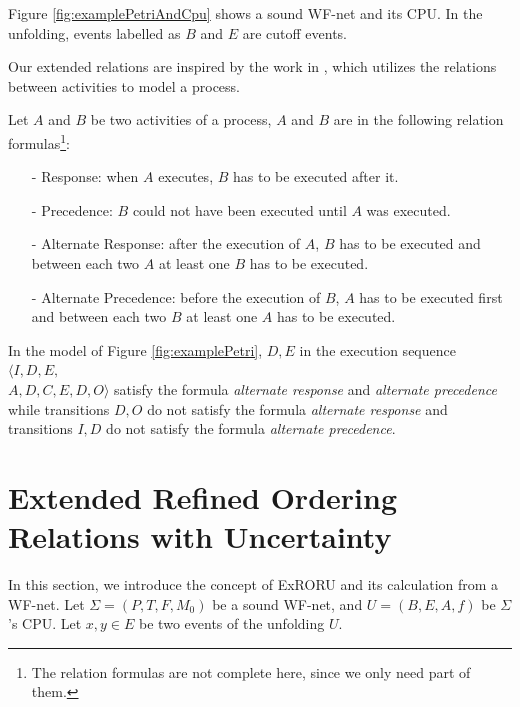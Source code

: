 \documentclass[dvips,...]{llncs}
\begin{document}
\begin{example}\label{ex:petriAndCpu}
Figure \ref{fig:examplePetriAndCpu} shows a sound WF-net and its CPU. In the unfolding, events labelled as $B$ and $E$ are cutoff events.
\end{example}

Our extended relations are inspired by the work in \cite{van2006decserflow}, which utilizes the relations between activities to model a process.
\begin{definition}\label{def:relationFormulas}
Let $A$ and $B$ be two activities of a process, $A$ and $B$ are in the following relation formulas\footnote{The relation formulas \cite{van2006decserflow} are not complete here, since we only need part of them.}:
	\begin{itemize}
		\item[-] Response: when $A$ executes, $B$ has to be executed after it.
		\item[-] Precedence: $B$ could not have been executed until $A$ was executed.
		\item[-] Alternate Response: after the execution of $A$, $B$ has to be executed and between each two $A$ at least one $B$ has to be executed.
		\item[-] Alternate Precedence: before the execution of $B$, $A$ has to be executed first and between each two $B$ at least one $A$ has to be executed.
	\end{itemize}
\end{definition}

\begin{example}\label{ex:relationFormulas}
In the model of Figure \ref{fig:examplePetri}, $D,E$ in the execution sequence $\langle I,D,E,$\\$A,D,C,E,D,O\rangle$ satisfy the formula \textit{alternate response} and \textit{alternate precedence} while transitions $D,O$ do not satisfy the formula \textit{alternate response} and transitions $I,D$ do not satisfy the formula \textit{alternate precedence}.
\end{example}

\section{Extended Refined Ordering Relations with Uncertainty}\label{sec:relations}
In this section, we introduce the concept of ExRORU and its calculation from a WF-net. Let $\Sigma=(P,T,F,M_{0})$ be a sound WF-net, and $U=(B,E,A,f)$ be $\Sigma$'s CPU. Let $x,y\in E$ be two events of the unfolding $U$.
\end{document}
